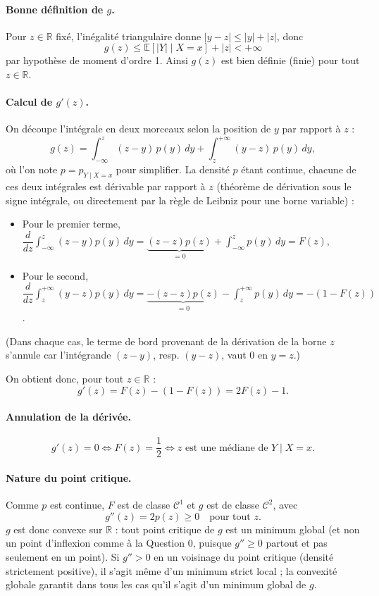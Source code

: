 \documentclass[11pt]{article}
\theoremstyle{remark}
\newcommand{\E}{\mathbb{E}}
\newcommand{\R}{\mathbb{R}}
\begin{document}
	\paragraph{Bonne définition de $g$.}
	Pour $z \in \R$ fixé, l'inégalité triangulaire donne $|y-z| \leq |y| + |z|$, donc
	\[
	g(z) \leq \E[|Y| \mid X=x] + |z| < +\infty
	\]
	par hypothèse de moment d'ordre 1. Ainsi $g(z)$ est bien définie (finie) pour tout $z \in \R$.
	
	\paragraph{Calcul de $g'(z)$.}
	On découpe l'intégrale en deux morceaux selon la position de $y$ par rapport à $z$ :
	\[
	g(z) = \int_{-\infty}^{z} (z-y)\,p(y)\,dy + \int_{z}^{+\infty} (y-z)\,p(y)\,dy,
	\]
	où l'on note $p = p_{Y\mid X=x}$ pour simplifier. La densité $p$ étant continue, chacune de ces deux intégrales est dérivable par rapport à $z$ (théorème de dérivation sous le signe intégrale, ou directement par la règle de Leibniz pour une borne variable) :
	
	\begin{itemize}
		\item Pour le premier terme, $\dfrac{d}{dz}\displaystyle\int_{-\infty}^{z}(z-y)p(y)\,dy = \underbrace{(z-z)p(z)}_{=0} + \displaystyle\int_{-\infty}^z p(y)\,dy = F(z)$,
		\item Pour le second, $\dfrac{d}{dz}\displaystyle\int_{z}^{+\infty}(y-z)p(y)\,dy = \underbrace{-(z-z)p(z)}_{=0} - \displaystyle\int_z^{+\infty} p(y)\,dy = -(1-F(z))$.
	\end{itemize}
	
	(Dans chaque cas, le terme de bord provenant de la dérivation de la borne $z$ s'annule car l'intégrande $(z-y)$, resp. $(y-z)$, vaut $0$ en $y=z$.)
	
	On obtient donc, pour tout $z \in \R$ :
	\[
	\boxed{g'(z) = F(z) - (1-F(z)) = 2F(z) - 1}.
	\]
	
	\paragraph{Annulation de la dérivée.}
	\[
	g'(z) = 0 \iff F(z) = \frac{1}{2} \iff z \text{ est une médiane de } Y \mid X=x.
	\]
	
	\paragraph{Nature du point critique.}
	Comme $p$ est continue, $F$ est de classe $\mathcal{C}^1$ et $g$ est de classe $\mathcal{C}^2$, avec
	\[
	g''(z) = 2 p(z) \geq 0 \quad \text{pour tout } z.
	\]
	$g$ est donc convexe sur $\R$ : tout point critique de $g$ est un minimum global (et non un point d'inflexion comme à la Question 0, puisque $g'' \geq 0$ partout et pas seulement en un point). Si $g'' > 0$ en un voisinage du point critique (densité strictement positive), il s'agit même d'un minimum strict local ; la convexité globale garantit dans tous les cas qu'il s'agit d'un minimum global de $g$.
	
\end{document}
